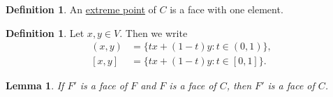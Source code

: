 \documentclass[12pt]{article}
\newtheorem{lma}[thm]{Lemma}
\theoremstyle{definition}
\newtheorem{defn}[thm]{Definition}
\begin{document}
\begin{defn}
	An \underline{extreme point} of $C$ is a face with one element.
\end{defn}

\begin{defn}
	Let $x, y \in V$.
	Then we write
	\begin{align*}
		(x,y) &= \lbrace tx + (1-t)y : t \in (0,1) \rbrace, \\
		[x,y] &= \lbrace tx + (1-t)y : t \in [0,1] \rbrace.
	\end{align*}
\end{defn}

\begin{lma}
	If $F'$ is a face of $F$ and $F$ is a face of $C$, then $F'$ is a face of $C$.
\end{lma}
\end{document}
